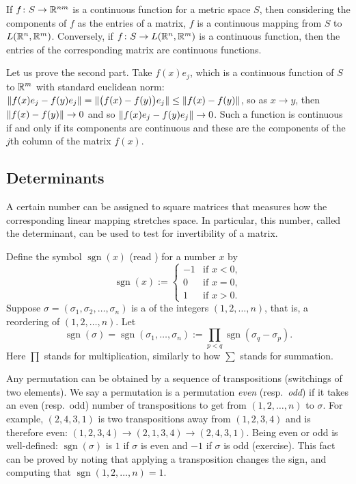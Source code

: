 \begin{prop}
If $f \colon S \to {\mathbb{R}}^{nm}$ is a continuous function
for a metric space $S$,
then considering the components of $f$ as the entries of a matrix,
$f$ is a continuous mapping from $S$
to $L({\mathbb{R}}^n,{\mathbb{R}}^m)$.
Conversely,
if $f \colon S \to L({\mathbb{R}}^n,{\mathbb{R}}^m)$ is a continuous function,
then the entries of the corresponding matrix are continuous functions.
\end{prop}

Let us prove the second part.  Take $f(x) e_j$, which
is a continuous function of $S$ to ${\mathbb{R}}^m$ with standard euclidean norm:
$\lVert {f(x) e_j - f(y) e_j} \rVert = 
\lVert {\bigl(f(x)- f(y) \bigr) e_j} \rVert \leq
\lVert {f(x)- f(y)} \rVert$, so as $x \to y$, then
$\lVert {f(x)- f(y)} \rVert \to 0$ and so 
$\lVert {f(x) e_j - f(y) e_j} \rVert \to 0$.
Such a
function is continuous if and only if its components are continuous
and these are the components of the $j$th column of the matrix $f(x)$.

\subsection{Determinants}

A certain number can be assigned to square matrices that measures
how the corresponding linear mapping stretches space.  In particular,
this number, called the determinant, can be used to test for invertibility of a matrix.

Define the symbol
$\operatorname{sgn}(x)$ (read ) for a number $x$ by
\begin{equation*}
\operatorname{sgn}(x)
:=
\begin{cases}
-1 & \text{if } x < 0 , \\
0  & \text{if } x = 0 , \\
1  & \text{if } x > 0 .
\end{cases}
\end{equation*}
Suppose 
$\sigma = (\sigma_1,\sigma_2,\ldots,\sigma_n)$ is a \emph{}
of the integers $(1,2,\ldots,n)$, that is, a reordering of $(1,2,\ldots,n)$. 
Let
\begin{equation} \label{eq:sgndef}
\operatorname{sgn}(\sigma) = \operatorname{sgn}(\sigma_1,\ldots,\sigma_n) := 
\prod_{p < q} \operatorname{sgn}(\sigma_q-\sigma_p) .
\end{equation}
Here $\prod$ stands for multiplication, similarly to how $\sum$ stands for
summation.

Any permutation can be obtained by
a sequence of transpositions (switchings of two elements).
We say a permutation is
a permutation \emph{even}
(resp.\ \emph{odd})
if it takes an even (resp.\ odd) number of
transpositions to get from $(1,2,\ldots,n)$ to $\sigma$.
For example, $(2,4,3,1)$ is two transpositions away from 
$(1,2,3,4)$ and is therefore even: $(1,2,3,4) \to (2,1,3,4) \to (2,4,3,1)$.
Being even or odd is well-defined:
$\operatorname{sgn}(\sigma)$ 
is $1$ if $\sigma$ is even and $-1$ if $\sigma$ is odd (exercise).
This fact can be proved by noting that applying
a transposition changes the sign, and computing that
$\operatorname{sgn}(1,2,\ldots,n) = 1$.

